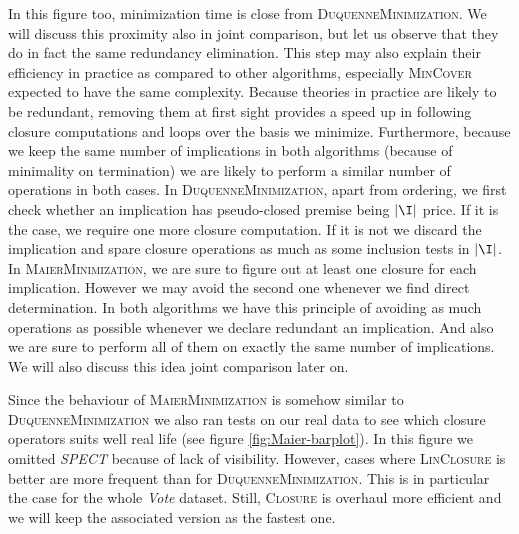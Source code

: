 \begin{figure}[H]
	
\end{figure}

\begin{figure}[H]
	
\end{figure} 

\vspace{1.2em} 

In this figure too, minimization time is close from \textsc{DuquenneMinimization}. We will discuss this proximity also in joint comparison, but let us observe that they do in fact the same redundancy elimination. This step may also explain their efficiency in practice as compared to other algorithms, especially \textsc{MinCover} expected to have 
the same complexity. Because theories in practice are likely to be redundant,
removing them at first sight provides a speed up in following closure computations and loops over the basis we minimize. Furthermore, because we keep the same number of implications in both algorithms (because of minimality on termination) we are likely to perform a similar number of operations in both cases. In \textsc{DuquenneMinimization}, apart from ordering, we first check whether an implication has pseudo-closed premise being $|\I|$ price. If it is the case, we require one more closure computation. If it is not we discard the implication and spare closure operations as much as some inclusion tests in $|\I|$. In \textsc{MaierMinimization}, we are sure to figure out at least one closure for each implication. However we may avoid the second one whenever we find direct determination. In both algorithms we have this principle of avoiding as much operations as possible whenever we declare redundant an implication. And also we are sure to perform all of them on exactly the same number of implications. We will also discuss this idea joint comparison later on.

\vspace{1.2em}

\noindent Since the behaviour of \textsc{MaierMinimization} is somehow similar to \textsc{DuquenneMinimization} we also ran tests on our real data to see which
closure operators suits well real life (see figure \ref{fig:Maier-barplot}). In
this figure we omitted \textit{SPECT} because of lack of visibility. However, cases where \textsc{LinClosure} is better are more frequent than for \textsc{DuquenneMinimization}. This is in particular the case for the whole \textit{Vote} dataset. Still, \textsc{Closure} is overhaul more efficient and 
we will keep the associated version as the fastest one.


